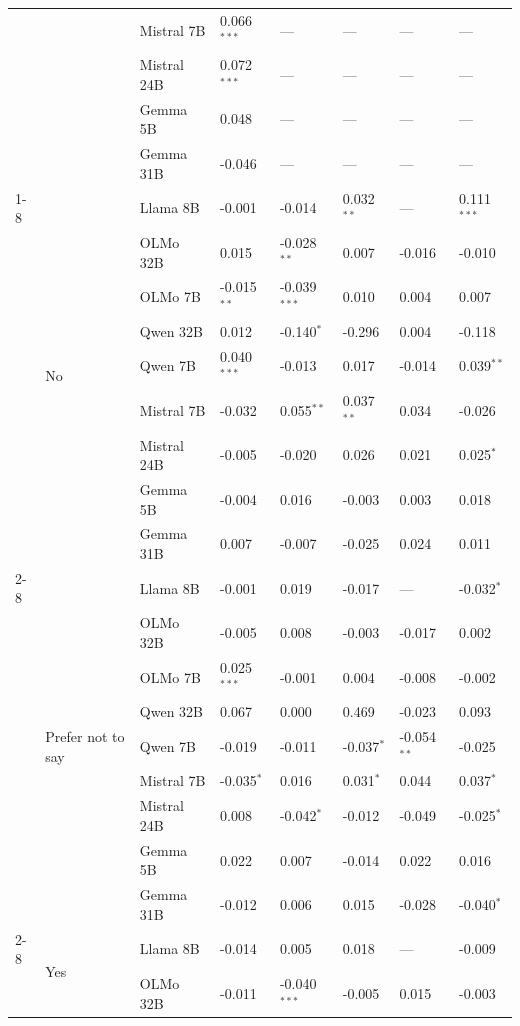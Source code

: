 \begin{longtable}[t]{llllllll}
 &  & Mistral 7B & 0.066$^{***}$ & --- & --- & --- & --- \\
 &  & Mistral 24B & 0.072$^{***}$ & --- & --- & --- & --- \\
 &  & Gemma 5B & 0.048 & --- & --- & --- & --- \\
 &  & Gemma 31B & -0.046 & --- & --- & --- & --- \\
\cline{1-8} \cline{2-8}
\multirow[t]{27}{*}{Is Parent} & \multirow[t]{9}{*}{No} & Llama 8B & -0.001 & -0.014 & 0.032$^{**}$ & --- & 0.111$^{***}$ \\
 &  & OLMo 32B & 0.015 & -0.028$^{**}$ & 0.007 & -0.016 & -0.010 \\
 &  & OLMo 7B & -0.015$^{**}$ & -0.039$^{***}$ & 0.010 & 0.004 & 0.007 \\
 &  & Qwen 32B & 0.012 & -0.140$^{*}$ & -0.296 & 0.004 & -0.118 \\
 &  & Qwen 7B & 0.040$^{***}$ & -0.013 & 0.017 & -0.014 & 0.039$^{**}$ \\
 &  & Mistral 7B & -0.032 & 0.055$^{**}$ & 0.037$^{**}$ & 0.034 & -0.026 \\
 &  & Mistral 24B & -0.005 & -0.020 & 0.026 & 0.021 & 0.025$^{*}$ \\
 &  & Gemma 5B & -0.004 & 0.016 & -0.003 & 0.003 & 0.018 \\
 &  & Gemma 31B & 0.007 & -0.007 & -0.025 & 0.024 & 0.011 \\
\cline{2-8}
 & \multirow[t]{9}{*}{Prefer not to say} & Llama 8B & -0.001 & 0.019 & -0.017 & --- & -0.032$^{*}$ \\
 &  & OLMo 32B & -0.005 & 0.008 & -0.003 & -0.017 & 0.002 \\
 &  & OLMo 7B & 0.025$^{***}$ & -0.001 & 0.004 & -0.008 & -0.002 \\
 &  & Qwen 32B & 0.067 & 0.000 & 0.469 & -0.023 & 0.093 \\
 &  & Qwen 7B & -0.019 & -0.011 & -0.037$^{*}$ & -0.054$^{**}$ & -0.025 \\
 &  & Mistral 7B & -0.035$^{*}$ & 0.016 & 0.031$^{*}$ & 0.044 & 0.037$^{*}$ \\
 &  & Mistral 24B & 0.008 & -0.042$^{*}$ & -0.012 & -0.049 & -0.025$^{*}$ \\
 &  & Gemma 5B & 0.022 & 0.007 & -0.014 & 0.022 & 0.016 \\
 &  & Gemma 31B & -0.012 & 0.006 & 0.015 & -0.028 & -0.040$^{*}$ \\
\cline{2-8}
 & \multirow[t]{9}{*}{Yes} & Llama 8B & -0.014 & 0.005 & 0.018 & --- & -0.009 \\
 &  & OLMo 32B & -0.011 & -0.040$^{***}$ & -0.005 & 0.015 & -0.003 \\

\end{longtable}
